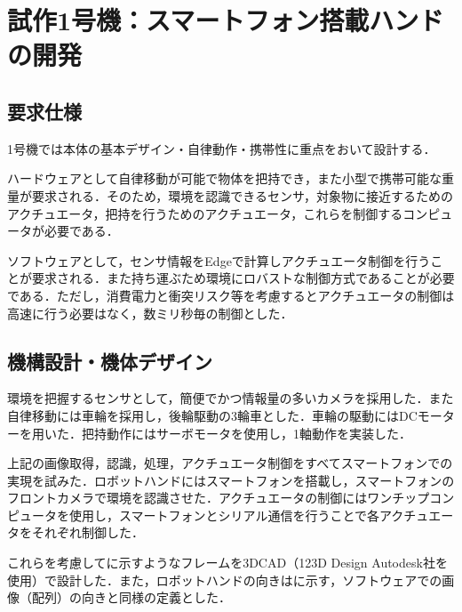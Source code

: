 \chapter{試作1号機：スマートフォン搭載ハンドの開発}
\newpage

\section{要求仕様}

1号機では本体の基本デザイン・自律動作・携帯性に重点をおいて設計する．

ハードウェアとして自律移動が可能で物体を把持でき，また小型で携帯可能な重量が要求される．そのため，環境を認識できるセンサ，対象物に接近するためのアクチュエータ，把持を行うためのアクチュエータ，これらを制御するコンピュータが必要である．

ソフトウェアとして，センサ情報をEdgeで計算しアクチュエータ制御を行うことが要求される．また持ち運ぶため環境にロバストな制御方式であることが必要である．ただし，消費電力と衝突リスク等を考慮するとアクチュエータの制御は高速に行う必要はなく，数ミリ秒毎の制御とした．


\section{機構設計・機体デザイン}
環境を把握するセンサとして，簡便でかつ情報量の多いカメラを採用した．また自律移動には車輪を採用し，後輪駆動の3輪車とした．車輪の駆動にはDCモーターを用いた．把持動作にはサーボモータを使用し，1軸動作を実装した．

上記の画像取得，認識，処理，アクチュエータ制御をすべてスマートフォンでの実現を試みた．ロボットハンドにはスマートフォンを搭載し，スマートフォンのフロントカメラで環境を認識させた．アクチュエータの制御にはワンチップコンピュータを使用し，スマートフォンとシリアル通信を行うことで各アクチュエータをそれぞれ制御した．

これらを考慮してに示すようなフレームを3DCAD（123D Design Autodesk社を使用）で設計した．また，ロボットハンドの向きはに示す，ソフトウェアでの画像（配列）の向きと同様の定義とした．

